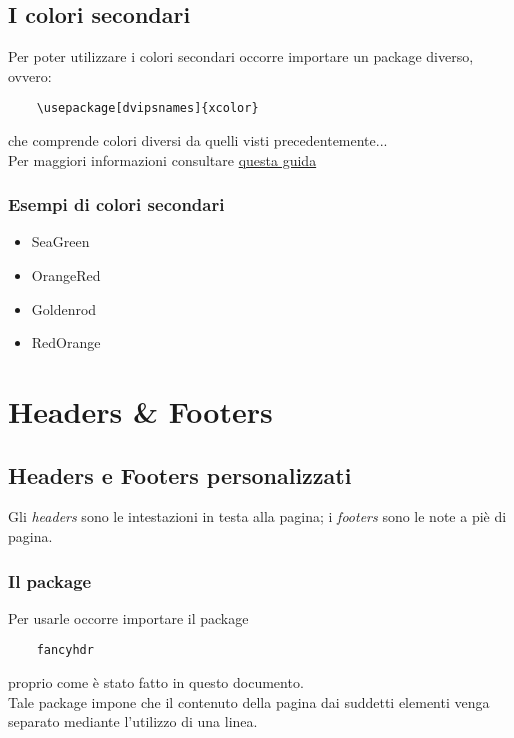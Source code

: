 \documentclass[a4paper, 12pt]{article}
\begin{document}
\subsection{I colori secondari}

Per poter utilizzare i colori secondari occorre importare un package diverso, ovvero:

\begin{verbatim}
    \usepackage[dvipsnames]{xcolor}
\end{verbatim}

che comprende colori diversi da quelli visti precedentemente...\\ Per maggiori informazioni consultare \href{https://en.wikibooks.org/wiki/LaTeX/Colors}{questa guida}

\subsubsection{Esempi di colori secondari}

\begin{itemize}
    \item {\color{SeaGreen}SeaGreen}
    \item {\color{OrangeRed}OrangeRed}
    \item {\color{Goldenrod}Goldenrod}
    \item {\color{RedOrange}RedOrange}
\end{itemize}



\section{Headers \& Footers}

\subsection{Headers e Footers personalizzati}
Gli \textit{headers} sono le intestazioni in testa alla pagina; i \textit{footers} sono le note a piè di pagina.

\subsubsection{Il package}
Per usarle occorre importare il package
\begin{verbatim}
    fancyhdr
\end{verbatim}
proprio come è stato fatto in questo documento.\\Tale package impone che il contenuto della pagina dai suddetti elementi venga separato mediante l'utilizzo di una linea.
\end{document}
